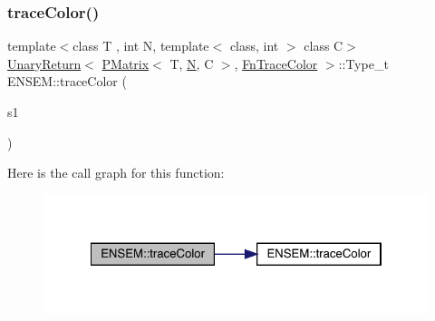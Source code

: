 \subsubsection{\texorpdfstring{traceColor()}{traceColor()}}
{\footnotesize\ttfamily template$<$class T , int N, template$<$ class, int $>$ class C$>$ \\
\mbox{\hyperlink{structENSEM_1_1UnaryReturn}{Unary\+Return}}$<$ \mbox{\hyperlink{classENSEM_1_1PMatrix}{P\+Matrix}}$<$ T, \mbox{\hyperlink{operator__name__util_8cc_a7722c8ecbb62d99aee7ce68b1752f337}{N}}, C $>$, \mbox{\hyperlink{structENSEM_1_1FnTraceColor}{Fn\+Trace\+Color}} $>$\+::Type\+\_\+t E\+N\+S\+E\+M\+::trace\+Color (\begin{DoxyParamCaption}\item[{const \mbox{\hyperlink{classENSEM_1_1PMatrix}{P\+Matrix}}$<$ T, \mbox{\hyperlink{operator__name__util_8cc_a7722c8ecbb62d99aee7ce68b1752f337}{N}}, C $>$ \&}]{s1 }\end{DoxyParamCaption})\hspace{0.3cm}{\ttfamily [inline]}}

Here is the call graph for this function\+:\nopagebreak
\begin{figure}[H]
\begin{center}
\leavevmode
\includegraphics[width=322pt]{df/d0a/group__primmatrix_ga1d05c45afa351dba712d9d083a013d41_cgraph}
\end{center}
\end{figure}
\mbox{\label{group__primmatrix_ga017dba078c2a41f5ca2a8d2b934b20aa}} 
